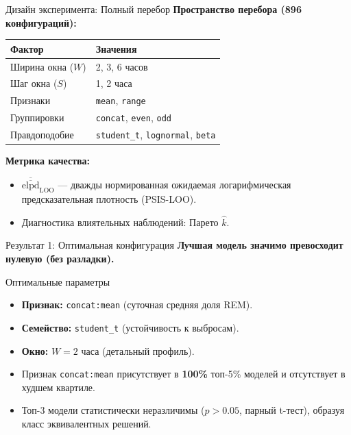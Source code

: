 \documentclass[12pt,aspectratio=169]{beamer}
\begin{document}
	\begin{frame}{Дизайн эксперимента: Полный перебор}
		\textbf{Пространство перебора (896 конфигураций):}
		
		\vspace{0.2cm}
		\begin{table}
			\small
			\begin{tabular}{ll}
				\toprule
				\textbf{Фактор} & \textbf{Значения} \\
				\midrule
				Ширина окна ($W$) & 2, 3, 6 часов \\
				Шаг окна ($S$) & 1, 2 часа \\
				Признаки & \texttt{mean}, \texttt{range} \\
				Группировки & \texttt{concat}, \texttt{even}, \texttt{odd} \\
				Правдоподобие & \texttt{student\_t}, \texttt{lognormal}, \texttt{beta} \\
				\bottomrule
			\end{tabular}
		\end{table}
		
		\vspace{0.2cm}
		\textbf{Метрика качества:}
		\begin{itemize}
			\item $\overline{\overline{\mathrm{elpd}}}_{\mathrm{LOO}}$ — дважды нормированная ожидаемая логарифмическая предсказательная плотность (PSIS-LOO).
			\item Диагностика влиятельных наблюдений: Парето $\hat{k}$.
		\end{itemize}
	\end{frame}
	
	\begin{frame}{Результат 1: Оптимальная конфигурация}
		\textbf{Лучшая модель значимо превосходит нулевую (без разладки).}
		
		\vspace{0.3cm}
		\begin{block}{Оптимальные параметры}
			\begin{itemize}
				\item \textbf{Признак:} \texttt{concat:mean} (суточная средняя доля REM).
				\item \textbf{Семейство:} \texttt{student\_t} (устойчивость к выбросам).
				\item \textbf{Окно:} $W = 2$ часа (детальный профиль).
			\end{itemize}
		\end{block}
		
		\vspace{0.2cm}
		\begin{itemize}
			\item Признак \texttt{concat:mean} присутствует в \textbf{100\%} топ-5\% моделей и отсутствует в худшем квартиле.
			\item Топ-3 модели статистически неразличимы ($p > 0.05$, парный t-тест), образуя класс эквивалентных решений.
		\end{itemize}
	\end{frame}
	
\end{document}
